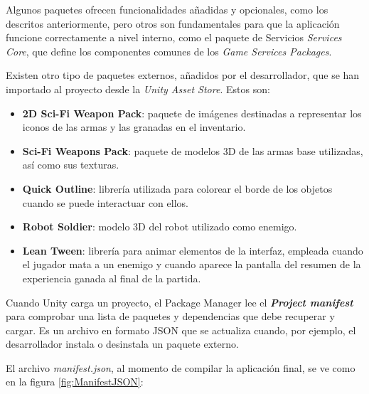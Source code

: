Algunos paquetes ofrecen funcionalidades añadidas y opcionales, como los descritos anteriormente, pero otros son fundamentales para que la aplicación funcione correctamente a nivel interno, como el paquete de Servicios \textit{Services Core}, que define los componentes comunes de los \textit{Game Services Packages}.

Existen otro tipo de paquetes externos, añadidos por el desarrollador, que se han importado al proyecto desde la \textit{Unity Asset Store}. Estos son:
\begin{itemize}
    \item \textbf{2D Sci-Fi Weapon Pack}: paquete de imágenes destinadas a representar los iconos de las armas y las granadas en el inventario.
    \item \textbf{Sci-Fi Weapons Pack}: paquete de modelos 3D de las armas base utilizadas, así como sus texturas.
    \item \textbf{Quick Outline}: librería utilizada para colorear el borde de los objetos cuando se puede interactuar con ellos.
    \item \textbf{Robot Soldier}: modelo 3D del robot utilizado como enemigo.
    \item \textbf{Lean Tween}: librería para animar elementos de la interfaz, empleada cuando el jugador mata a un enemigo y cuando aparece la pantalla del resumen de la experiencia ganada al final de la partida.
\end{itemize}
Cuando Unity carga un proyecto, el Package Manager lee el \textbf{\textit{Project manifest}} para comprobar una lista de paquetes y dependencias que debe recuperar y cargar. Es un archivo en formato JSON que se actualiza cuando, por ejemplo, el desarrollador instala o desinstala un paquete externo.

El archivo \textit{manifest.json}, al momento de compilar la aplicación final, se ve como en la figura \ref{fig:ManifestJSON}:

